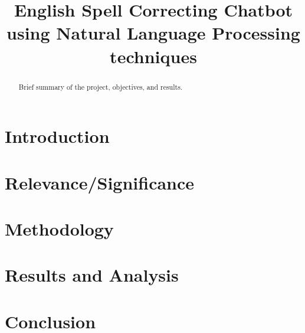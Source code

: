\documentclass[conference]{IEEEtran}
\begin{document}
\title{English Spell Correcting Chatbot using Natural Language Processing techniques}

\author{
}

\maketitle

\begin{abstract}
Brief summary of the project, objectives, and results.
\end{abstract}

\section{Introduction}


\section{Relevance/Significance}


\section{Methodology}


\section{Results and Analysis}


\section{Conclusion}




\end{document}
